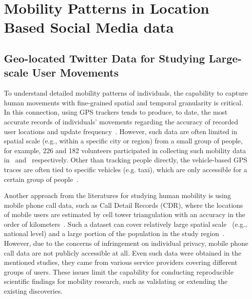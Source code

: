 \documentclass[ijgi,article,accept,moreauthors,pdftex,10pt,a4paper]{mdpi}
\theoremstyle{mdpi}
\newcounter{ex}
\newcounter{re}
\theoremstyle{mdpidefinition}
\begin{document}
\section{Mobility Patterns in Location Based Social Media data}
\subsection{Geo-located Twitter Data for Studying Large-scale User Movements}
To understand detailed mobility patterns of individuals, the capability to capture human movements with fine-grained spatial and temporal granularity is critical.
In this connection, using GPS trackers tends to produce, to date, the most accurate records of individuals' movements regarding the accuracy of recorded user locations and update frequency~\cite{zheng2008understanding}.
However, such data are often limited in spatial scale (e.g., within a specific city or region) from a small group of people, for example, 226 and 182 volunteers participated in collecting such mobility data in~\cite{rhee2011levy} and~\cite{zheng2010geolife} respectively.
Other than tracking people directly, the vehicle-based GPS traces are often tied to specific vehicles (e.g. taxi), which are only accessible for a certain group of people~\cite{kung2014exploring}. 

Another approach from the literatures for studying human mobility is using mobile phone call data, such as Call Detail Records (CDR), where the locations of mobile users are estimated by cell tower triangulation with an accuracy in the order of kilometers~\cite{gonzalez2008understanding,sevtsuk2010does,kung2014exploring}.
Such a dataset can cover relatively large spatial scale~\cite{becker2013human,sobolevsky2013delineating} (e.g., national level) and a large portion of the population in the study region~\cite{kung2014exploring}.
However, due to the concerns of infringement on individual privacy, mobile phone call data are not publicly accessible at all.
Even such data were obtained in the mentioned studies, they came from various service providers covering different groups of users.
These issues limit the capability for conducting reproducible scientific findings for mobility research, such as validating or extending the existing discoveries.
\end{document}
